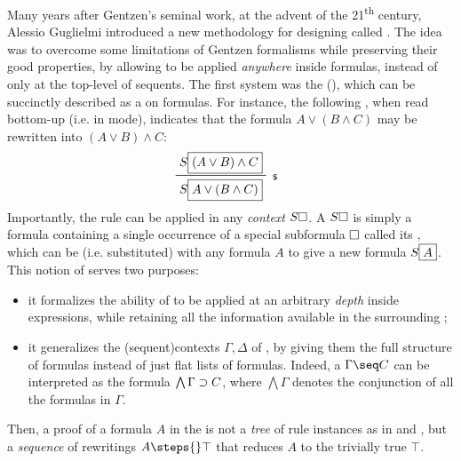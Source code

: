 \AP
Many years after Gentzen's seminal work, at the advent of the
21\textsuperscript{th} century, Alessio Guglielmi introduced a new methodology
for designing  called 
. The idea was to overcome some limitations of
Gentzen formalisms while preserving their good properties, by allowing
 to be applied \emph{anywhere} inside formulas, instead of
only at the top-level of sequents. The
first  system was the 
(), which can be succinctly described as a 
on formulas. For instance, the following , when read
bottom-up (i.e. in  mode), indicates that the formula $A \lor (B
\land C)$ may be rewritten into $(A \lor B) \land C$:
$$\R[\rsf{s}]{S\select{(A \lor B) \land C}}{S\select{A \lor (B \land C)}}$$
\AP Importantly, the rule can be applied in any \emph{context} $S\square$. A
 $S\square$ is simply a formula containing a single occurrence of a
special subformula $\square$ called its , which can be 
(i.e. substituted) with any formula $A$ to give a new formula $S\fbox{$A$}$.
This notion of  serves two purposes:
\begin{itemize}
  \item it formalizes the ability of  to be applied at an
  arbitrary \emph{depth} inside expressions, while retaining all the information
  available in the surrounding ;
  \item it generalizes the \kl(sequent){contexts} $\Gamma, \Delta$ of
  , by giving them the full structure of formulas instead
  of just flat lists of formulas. Indeed, a  $\Gamma \seq C$ can be
  interpreted as the formula $\bigwedge \Gamma \supset C$, where $\bigwedge
  \Gamma$ denotes the conjunction of all the formulas in $\Gamma$.
\end{itemize}
Then, a proof of a formula $A$ in the  is not a
\emph{tree} of rule instances as in  and , but a \emph{sequence} of rewritings $A \steps{} \top$ that reduces
$A$ to the trivially true  $\top$.

